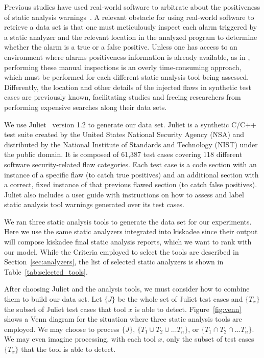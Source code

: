 Previous studies have used real-world software to arbitrate about the
positiveness of static analysis warnings~\citep{kremenek2004correlation,
jung2005taming, yoon2014reducing, yuksel2013classification,
ruthruff_predicting_2008}. A relevant obstacle for using real-world software to
retrieve a data set is that one must meticulously inspect each alarm triggered
by a static analyzer and the relevant location in the analyzed program to
determine whether the alarm is a true or a false positive.  Unless one has
access to an environment where alarms positiveness information is already
available, as in \cite{ruthruff_predicting_2008}, performing these
manual inspections is an overly time-consuming approach, which must be
performed for each different static analysis tool being assessed. Differently,
the location and other details of the injected flaws in synthetic test cases
are previously known, facilitating studies and freeing researchers from
performing expensive searches along their data sets.

We use Juliet~\citep{juliet} version 1.2 to generate our data set. Juliet is a
synthetic C/C++ test suite created by the United States National Security
Agency (NSA) and distributed by the National Institute of Standards and
Technology (NIST) under the public domain. It is composed of 61,387 test cases
covering 118 different software security-related flaw categories. Each test
case is a code section with an instance of a specific flaw (to catch true
positives) and an additional section with a correct, fixed instance of that
previous flawed section (to catch false positives).  Juliet also includes a
user guide with instructions on how to assess and label static analysis tool
warnings generated over its test cases.

We ran three static analysis tools to generate the data set for our
experiments. Here we use the same static analyzers integrated into
kiskadee since their output will compose kiskadee final
static analysis reports, which we want to rank with our model.
While the Criteria employed to select the tools are described
in Section~\ref{sec:analyzers}, the list of selected static
analyzers is shown in Table~\ref{tab:selected_tools}.

After choosing Juliet and the analysis tools, we must consider how to combine
them to build our data set. Let $\{J\}$ be the whole set of Juliet test cases
and $\{T_x\}$ the subset of Juliet test cases that tool $x$ is able to detect.
Figure~\ref{fig:venn} shows a Venn diagram for the situation where three static
analysis tools are employed. We may choose to process $\{J\}$, $\{T_1 \cup
T_2\cup\dots T_n\}$, or $\{T_1 \cap T_2 \cap\dots T_n\}$. We may even imagine
processing, with each tool $x$, only the subset of test cases $\{T_x\}$ that
the tool is able to detect.

